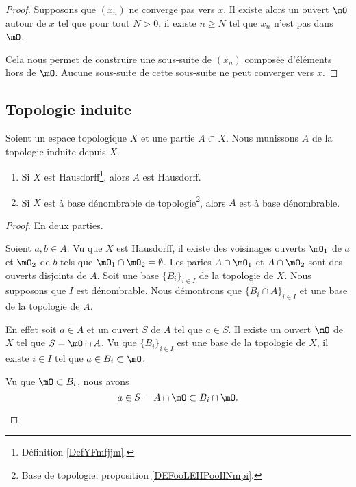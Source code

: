 \begin{proof}
	Supposons que \( (x_n)\) ne converge pas vers \( x\). Il existe alors un ouvert \( \mO\) autour de \( x\) tel que pour tout \( N>0\), il existe \( n\geq N\) tel que \( x_n\) n'est pas dans \( \mO\).

	Cela nous permet de construire une sous-suite de \( (x_n)\) composée d'éléments hors de \( \mO\). Aucune sous-suite de cette sous-suite ne peut converger vers \( x\).
\end{proof}


\subsection{Topologie induite}


\begin{proposition}	\label{PROPooAHIMooYhOwUf}
	Soient un espace topologique \( X\) et une partie \( A\subset X\). Nous munissons \( A\) de la topologie induite depuis \( X\).
	\begin{enumerate}
		\item		\label{ITEMooLXGWooYgPqoT}
		      Si \( X\) est Hausdorff\footnote{Définition \ref{DefYFmfjjm}.}, alors \( A\) est Hausdorff.
		\item		\label{ITEMooOQZDooGztljW}
		      Si \( X\) est à base dénombrable de topologie\footnote{Base de topologie, proposition \ref{DEFooLEHPooIlNmpi}.}, alors \( A\) est à base dénombrable.
	\end{enumerate}
\end{proposition}

\begin{proof}
	En deux parties.
	\begin{subproof}
		Soient \( a,b\in A\). Vu que \( X\) est Hausdorff, il existe des voisinages ouverts \( \mO_1\) de \( a\) et \( \mO_2\) de \( b\) tels que \( \mO_1\cap\mO_2=\emptyset\). Les paries \( A\cap\mO_1\) et \( A\cap\mO_2\) sont des ouverts disjoints de \( A\).
		Soit une base \( \{ B_i \}_{i\in I}\) de la topologie de \( X\). Nous supposons que \( I\) est dénombrable. Nous démontrons que \( \{ B_i\cap A \}_{i\in I}\) et une base de la topologie de \( A\).

		En effet soit \( a\in A\) et un ouvert \( S\) de \( A\) tel que \( a\in S\). Il existe un ouvert \( \mO\) de \( X\) tel que \( S=\mO\cap A\). Vu que \( \{ B_i \}_{i\in I}\) est une base de la topologie de \( X\), il existe \( i\in I\) tel que \( a\in B_i\subset\mO\).

		Vu que \( \mO\subset B_i\), nous avons
		\begin{equation}
			a\in S=A\cap\mO\subset B_i\cap\mO.
		\end{equation}
	\end{subproof}
\end{proof}

